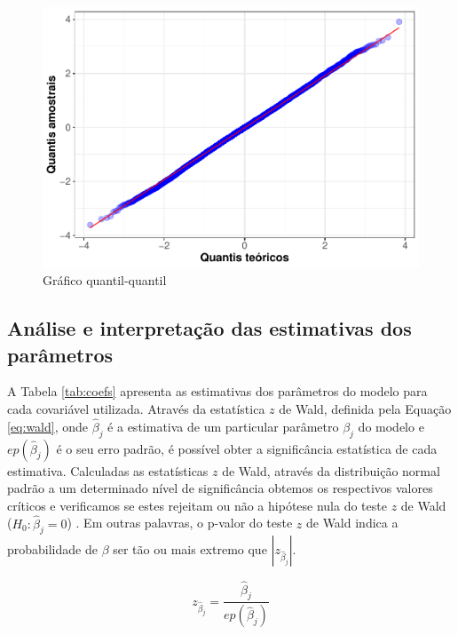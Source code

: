 \documentclass[twocolumn]{rbef}
\newcommand{\1}{\mathbbm{1}}
\begin{document}
\begin{figure}

{\centering \includegraphics[width=1\linewidth]{article_files/figure-latex/qqplot-1} 

}

\caption{Gráfico quantil-quantil}\label{fig:qqplot}
\end{figure}

\hypertarget{anuxe1lise-e-interpretauxe7uxe3o-das-estimativas-dos-paruxe2metros}{%
\subsection{Análise e interpretação das estimativas dos parâmetros}\label{anuxe1lise-e-interpretauxe7uxe3o-das-estimativas-dos-paruxe2metros}}

A Tabela \ref{tab:coefs} apresenta as estimativas dos parâmetros do modelo para cada covariável utilizada. Através da estatística \(z\) de Wald, definida pela Equação \eqref{eq:wald}, onde \(\hat{\beta}_j\) é a estimativa de um particular parâmetro \(\beta_j\) do modelo e \(ep(\hat{\beta}_j)\) é o seu erro padrão, é possível obter a significância estatística de cada estimativa. Calculadas as estatísticas \(z\) de Wald, através da distribuição normal padrão a um determinado nível de significância obtemos os respectivos valores críticos e verificamos se estes rejeitam ou não a hipótese nula do teste \(z\) de Wald (\(H_0:\hat{\beta}_j=0\)) \cite{Favero2017}. Em outras palavras, o p-valor do teste \(z\) de Wald indica a probabilidade de \(\beta\) ser tão ou mais extremo que \(|z_{\hat{\beta}_j}|\).

\begin{equation}
z_{\hat{\beta}_j}=\dfrac{\hat{\beta}_j}{ep(\hat{\beta}_j)}\label{eq:wald}
\end{equation}
\end{document}
